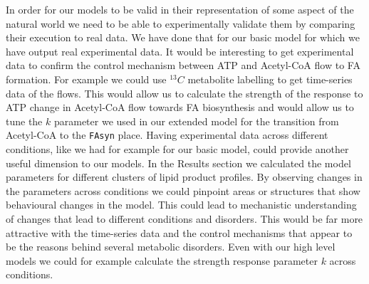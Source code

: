 In order for our models to be valid in their representation of some
aspect of the natural world we need to be able to experimentally
validate them by comparing their execution to real data. We have done
that for our basic model for which we have output real experimental
data. It would be interesting to get experimental data to confirm the
control mechanism between ATP and Acetyl-CoA flow to FA formation. For
example we could use $^{13}C$ metabolite labelling to get time-series
data of the flows. This would allow us to calculate the strength of
the response to ATP change in Acetyl-CoA flow towards FA biosynthesis
and would allow us to tune the $k$ parameter we used in our extended
model for the transition from Acetyl-CoA to the \texttt{FAsyn}
place. Having experimental data across different conditions, like we
had for example for our basic model, could provide another useful
dimension to our models. In the Results section we calculated the
model parameters for different clusters of lipid product profiles. By
observing changes in the parameters across conditions we could
pinpoint areas or structures that show behavioural changes in the model. This could lead
to mechanistic understanding of changes that lead to different
conditions and disorders. This would be far more attractive with the
time-series data and the control mechanisms that appear to be the
reasons behind several metabolic disorders. Even with our high level
models we could for example calculate the strength response parameter
$k$ across conditions.



